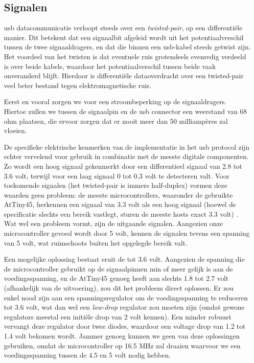 \subsection{Signalen}

\ac{usb} datacommunicatie verloopt steeds over een \emph{twisted-pair}, op een differentiële manier. Dit betekent dat een signaalbit afgeleid wordt uit het potentiaalverschil tussen de twee signaaldragers, en dat die binnen een \ac{usb}-kabel steeds getwist zijn. Het voordeel van het twisten is dat eventuele ruis grotendeels evenredig verdeeld is over beide kabels, waardoor het potentiaalverschil tussen beide vaak onveranderd blijft. Hierdoor is differentiële dataoverdracht over een twisted-pair veel beter bestand tegen elektromagnetische ruis.

Eerst en vooral zorgen we voor een stroombeperking op de signaaldragers. Hiertoe zullen we tussen de signaalpin en de \ac{usb} connector een weerstand van 68 ohm plaatsen, die ervoor zorgen dat er nooit meer dan 50 milliampères zal vloeien.

De specifieke elektrische kenmerken van de implementatie in het \ac{usb} protocol zijn echter vervelend voor gebruik in combinatie met de meeste digitale componenten. Zo wordt een hoog signaal gekenmerkt door een differentieel signaal van 2.8 tot 3.6 volt, terwijl voor een laag signaal 0 tot 0.3 volt te detecteren valt. Voor toekomende signalen (het twisted-pair is immers half-duplex) vormen deze waarden geen probleem: de meeste microcontrollers, waaronder de gebruikte AtTiny45, herkennen een signaal van 3.3 volt als een hoog signaal (hoewel de specificatie slechts een bereik vastlegt, sturen de meeste hosts exact 3.3 volt) . Wat wel een probleem vormt, zijn de uitgaande signalen. Aangezien onze microcontroller gevoed wordt door 5 volt, kennen de signalen tevens een spanning van 5 volt, wat ruimschoots buiten het opgelegde bereik valt.

Een mogelijke oplossing bestaat eruit de  tot 3.6 volt. Aangezien de spanning die de microcontroller gebruikt op de signaalpinnen min of meer gelijk is aan de voedingsspanning, en de AtTiny45 genoeg heeft aan slechts 1.8 tot 2.7 volt (afhankelijk van de uitvoering), zou dit het probleem direct oplossen. Er zou enkel nood zijn aan een spanningsregulator om de voedingsspanning te reduceren tot 3.6 volt, wat dan wel een \emph{low-drop} regulator zou moeten zijn (omdat gewone regulators meestal een initiële drop van 2 volt kennen). Een minder robuust vervangt deze regulator door twee diodes, waardoor een voltage drop van 1.2 tot 1.4 volt bekomen wordt.
Jammer genoeg kunnen we geen van deze oplossingen gebruiken, omdat de microcontroller op 16.5 MHz zal draaien waarvoor we een voedingsspanning tussen de 4.5 en 5 volt nodig hebben.

